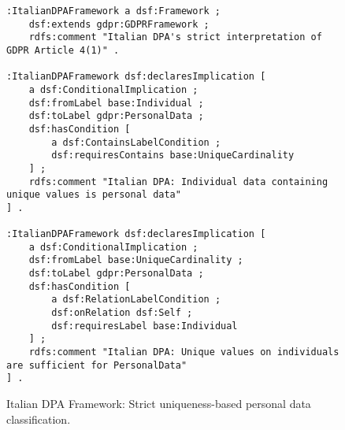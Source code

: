 \documentclass{IOS-Book-Article}
\begin{document}
\begin{figure}[ht]
\begin{lstlisting}[basicstyle=\ttfamily, frame=none]
:ItalianDPAFramework a dsf:Framework ;
    dsf:extends gdpr:GDPRFramework ;
    rdfs:comment "Italian DPA's strict interpretation of GDPR Article 4(1)" .

:ItalianDPAFramework dsf:declaresImplication [
    a dsf:ConditionalImplication ;
    dsf:fromLabel base:Individual ;
    dsf:toLabel gdpr:PersonalData ;
    dsf:hasCondition [
        a dsf:ContainsLabelCondition ;
        dsf:requiresContains base:UniqueCardinality
    ] ;
    rdfs:comment "Italian DPA: Individual data containing unique values is personal data"
] .

:ItalianDPAFramework dsf:declaresImplication [
    a dsf:ConditionalImplication ;
    dsf:fromLabel base:UniqueCardinality ;
    dsf:toLabel gdpr:PersonalData ;
    dsf:hasCondition [
        a dsf:RelationLabelCondition ;
        dsf:onRelation dsf:Self ;
        dsf:requiresLabel base:Individual
    ] ;
    rdfs:comment "Italian DPA: Unique values on individuals are sufficient for PersonalData"
] .
\end{lstlisting}
\caption{Italian DPA Framework: Strict uniqueness-based personal data classification.}
\label{fig:appendix-italian-dpa}
\end{figure}
\end{document}
